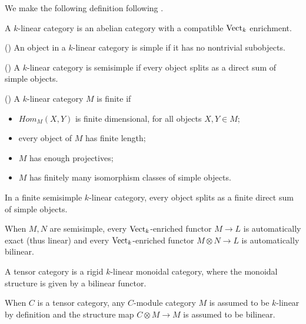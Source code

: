 \noindent We make the following definition following \cite{douglas/balanced-product}.

\begin{definition}
  A $k$-linear category is an abelian category with a compatible $\operatorname{Vect}_k$
  enrichment.
\end{definition}

\begin{definition} (\cite{egno/tensor-cats})
  An object in a $k$-linear category is simple if it has no nontrivial subobjects.
\end{definition}

\begin{definition} (\cite{egno/tensor-cats})
  A $k$-linear category is semisimple if every object splits as a direct sum
  of simple objects.
\end{definition}


\begin{definition} (\cite{egno/tensor-cats})
  A $k$-linear category $M$ is finite if
  \begin{itemize}
    \item $Hom_M(X,Y)$ is finite dimensional, for all objects $X,Y\in M$;
    \item every object of $M$ has finite length;
    \item $M$ has enough projectives;
    \item $M$ has finitely many isomorphism classes of simple objects.
  \end{itemize}
\end{definition}

\begin{remark}
  In a finite semisimple $k$-linear category, every object splits as a finite
  direct sum of simple objects.
\end{remark}

\begin{remark}
  When $M,N$ are semisimple, every $\operatorname{Vect}_{k}$-enriched functor $M\to L$ is automatically exact (thus linear)
  and every $\operatorname{Vect}_{k}$-enriched functor $M\otimes N\to L$ is automatically bilinear.
\end{remark}

\begin{definition}
  A tensor category is a rigid $k$-linear monoidal category, where the
  monoidal structure is given by a bilinear functor. 
\end{definition}

\begin{definition}
 When $C$ is a tensor category, any $C$-module category $M$ is assumed to be $k$-linear by definition and the structure map $C\otimes M\to M$ is assumed to be bilinear. 
\end{definition}

